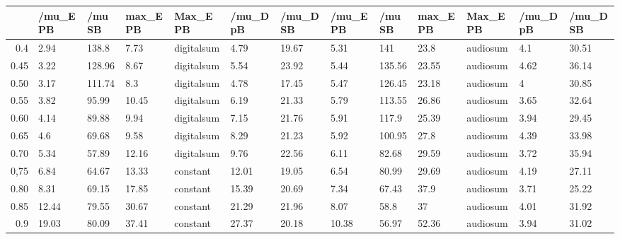 \begin{table}[ht]
\centering
\begin{tabular}{rllllllllllll}
  \hline
 & /mu\_E PB & /mu SB & max\_E PB & Max\_E PB & /mu\_D pB & /mu\_D SB & /mu\_E PB & /mu SB & max\_E PB & Max\_E PB & /mu\_D pB & /mu\_D SB \\ 
  \hline
0.4 & 2.94 & 138.8 & 7.73 & digitalsum & 4.79 & 19.67 & 5.31 & 141 & 23.8 & audiosum & 4.1 & 30.51 \\ 
  0.45 & 3.22 & 128.96 & 8.67 & digitalsum & 5.54 & 23.92 & 5.44 & 135.56 & 23.55 & audiosum & 4.62 & 36.14 \\ 
  0.50 & 3.17 & 111.74 & 8.3 & digitalsum & 4.78 & 17.45 & 5.47 & 126.45 & 23.18 & audiosum & 4 & 30.85 \\ 
  0.55 & 3.82 & 95.99 & 10.45 & digitalsum & 6.19 & 21.33 & 5.79 & 113.55 & 26.86 & audiosum & 3.65 & 32.64 \\ 
  0.60 & 4.14 & 89.88 & 9.94 & digitalsum & 7.15 & 21.76 & 5.91 & 117.9 & 25.39 & audiosum & 3.94 & 29.45 \\ 
  0.65 & 4.6 & 69.68 & 9.58 & digitalsum & 8.29 & 21.23 & 5.92 & 100.95 & 27.8 & audiosum & 4.39 & 33.98 \\ 
  0.70 & 5.34 & 57.89 & 12.16 & digitalsum & 9.76 & 22.56 & 6.11 & 82.68 & 29.59 & audiosum & 3.72 & 35.94 \\ 
  0,75 & 6.84 & 64.67 & 13.33 & constant & 12.01 & 19.05 & 6.54 & 80.99 & 29.69 & audiosum & 4.19 & 27.11 \\ 
  0.80 & 8.31 & 69.15 & 17.85 & constant & 15.39 & 20.69 & 7.34 & 67.43 & 37.9 & audiosum & 3.71 & 25.22 \\ 
  0.85 & 12.44 & 79.55 & 30.67 & constant & 21.29 & 21.96 & 8.07 & 58.8 & 37 & audiosum & 4.01 & 31.92 \\ 
  0.9 & 19.03 & 80.09 & 37.41 & constant & 27.37 & 20.18 & 10.38 & 56.97 & 52.36 & audiosum & 3.94 & 31.02 \\ 
   \hline
\end{tabular}
\end{table}
